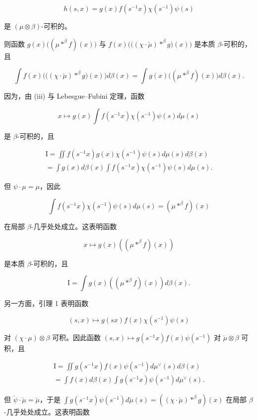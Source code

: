 \[
h (s, x) = g (x) f \left(s ^ {- 1} x\right) \chi \left(s ^ {- 1}\right) \psi (s)
\]

是 \((\mu \otimes \beta)\)-可积的。

则函数 \(g(x)\big((\mu * ^ {\beta} f)(x)\big)\) 与 \(f(x)\big(\big((\chi \cdot \breve{\mu}) * ^ {\beta} g\big)(x)\big)\) 是本质 \(\beta\)-可积的，且

\[
\int f (x) \big (\big ((\chi \cdot \breve {\mu}) * ^ {\beta} g \big) (x) \big) d \beta (x) = \int g (x) \big ((\mu * ^ {\beta} f) (x) \big) d \beta (x).\tag{8}
\]

因为，由 (iii) 与 Lebesgue--Fubini 定理，函数

\[
x \mapsto g (x) \int f (s ^ {- 1} x) \chi (s ^ {- 1}) \psi (s) d \mu (s)
\]

是 \(\beta\)-可积的，且

\[
\begin{array}{l} \mathrm{I} = \iint f (s ^ {- 1} x) g (x) \chi (s ^ {- 1}) \psi (s) d \mu (s) d \beta (x) \\ = \int g (x) d \beta (x) \int f (s ^ {- 1} x) \chi (s ^ {- 1}) \psi (s) d \mu (s). \end{array}
\]

但 \(\psi \cdot \mu = \mu\)，因此

\[
\int f (s ^ {- 1} x) \chi (s ^ {- 1}) \psi (s) d \mu (s) = (\mu * ^ {\beta} f) (x)
\]

在局部 \(\beta\)-几乎处处成立。这表明函数

\[
x \mapsto g (x) \left(\left(\mu * ^ {\beta} f\right) (x)\right)
\]

是本质 \(\beta\)-可积的，且

\[
\mathrm{I} = \int g (x) \left(\left(\mu * ^ {\beta} f\right) (x)\right) d \beta (x).
\]

另一方面，引理 1 表明函数

\[
(s, x) \mapsto g (s x) f (x) \chi (s ^ {- 1}) \psi (s)
\]

对 \((\chi \cdot \mu) \otimes \beta\) 可积。因此函数 \((s, x) \mapsto g(s^{-1}x)f(x)\psi(s^{-1})\) 对 \(\breve{\mu} \otimes \beta\) 可积，且

\[
\begin{array}{l} \mathrm{I} = \iint g (s ^ {- 1} x) f (x) \psi (s ^ {- 1}) d \mu^ {\vee} (s) d \beta (x) \\ = \int f (x) d \beta (x) \int g (s ^ {- 1} x) \psi (s ^ {- 1}) d \mu^ {\vee} (s). \end{array}
\]

但 \(\check{\psi} \cdot \check{\mu} = \check{\mu}\)，于是 \(\int g(s^{-1}x)\psi(s^{-1})d\check{\mu}(s) = ((\chi \cdot \check{\mu}) *^{\beta}g)(x)\) 在局部 \(\beta\)-几乎处处成立。这表明函数

